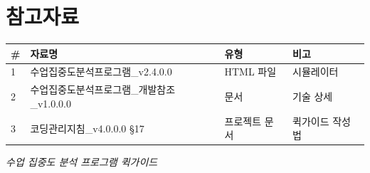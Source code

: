 \documentclass[11pt,a4paper]{article}
\begin{document}
\section*{참고자료}

\begin{center}
\renewcommand{\arraystretch}{1.4}
\begin{tabular}{|p{1.5cm}|p{7.6cm}|p{2.7cm}|p{3.2cm}|}
\hline
\rowcolor{tableheader}
\textbf{\#} & \textbf{자료명} & \textbf{유형} & \textbf{비고} \\
\hline
1 & 수업집중도분석프로그램\_v2.4.0.0 & HTML 파일 & 시뮬레이터 \\
\hline
2 & 수업집중도분석프로그램\_개발참조\_v1.0.0.0 & 문서 & 기술 상세 \\
\hline
3 & 코딩관리지침\_v4.0.0.0 \S{}17 & 프로젝트 문서 & 퀵가이드 작성법 \\
\hline
\end{tabular}
\end{center}


\vfill
\begin{center}
\small\color{lightbrown}
\textit{수업 집중도 분석 프로그램 퀵가이드}
\end{center}
\end{document}
